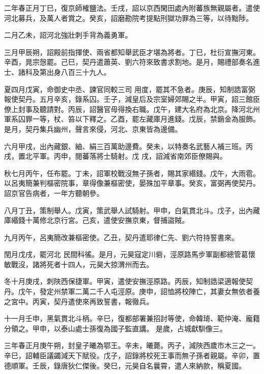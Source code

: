 \begin{pinyinscope}
 二年春正月丁巳，復京師榷鹽法。壬戌，詔以京西閑田處內附蕃族無親屬者。遣使河北募兵，及萬人者賞之。癸亥，詔磨勘院考提點刑獄功罪為三等，以待黜陟。



 二月乙未，詔河北強壯刺手背為義勇軍。



 三月甲辰朔，詔殿前指揮使、兩省都知舉武臣才堪為將者。丁巳，杜衍宣撫河東。辛酉，晁宗愨罷。己巳，契丹遣蕭英、劉六符來致書求割地。是月，賜禮部奏名進士、諸科及第出身八百三十九人。



 夏四月戊寅，命御史中丞、諫官同較三司
 用度，罷其不急者。庚辰，知制誥富弼報使契丹。五月辛亥，錄系囚。壬子，減皇后及宗室婦郊賜之半。甲寅，詔三館臣僚上封事及聽請對。丙辰，詔醫官毋得換右職。戊午，建大名府為北京。降河北州軍系囚罪一等，杖、笞以下釋之。乙酉，罷左藏庫月進錢。戊辰，禁銷金為服飾。是月，契丹集兵幽州，聲言來侵，河北、京東皆為邊備。



 六月甲戌，出內藏銀、紬、絹三百萬助邊費。癸未，以特奏名武藝人補三班。丙戌，置北平軍。丙申，閱蕃落將士騎射。戊
 戌，詔減省南郊臣僚賜與。



 秋七月丙午，任布罷。丁未，詔軍校戰沒無子孫者，賜其家緡錢。戊午，大雨雹。以呂夷簡兼判樞密院事，章得像兼樞密使，晏殊加平章事。癸亥，富弼再使契丹。詔京官告病者，一年方聽朝參。



 八月丁丑，策制舉人。戊寅，策武舉人試騎射。甲申，白氣貫北斗。戊子，出內藏庫緡錢十萬修北京行宮。己亥，遣使安撫京東，督捕盜賊。



 九月丙午，呂夷簡改兼樞密使。乙丑，契丹遣耶律仁先、劉六符持誓書來。



 閏月戊戌，罷河北
 民間科徭。是月，元昊寇定川砦，涇原路馬步軍副都總管葛懷敏戰沒，諸將死者十四人，元昊大掠渭州而去。



 冬十月庚戌，刺陜西保捷軍。甲寅，遣使安撫涇原路。丙辰，知制誥梁適報使契丹。戊午，發定州禁軍二萬二千人屯涇原。庚申，詔恤將校陣亡，其妻女無依者養之宮中。丙寅，契丹遣使來再致誓書，報徹兵。



 十一月壬申，黑氣貫北斗柄。辛巳，復都部署兼招討等使，命韓琦、範仲淹、龐籍分領之。甲申，以泰山處士孫復為國子監直講。
 是歲，占城獻馴像三。



 三年春正月庚午朔，封皇子曦為鄂王。辛未，曦薨。丙子，減陜西歲市木三之一。辛巳，詔輔臣議蠲減天下賦役。戊子，詔錄將校死王事而無子孫者親屬。辛卯，置德順軍。壬辰，錄唐狄仁傑後。癸巳，元昊自名曩霄，遣人來納款，稱夏國。




\end{pinyinscope}
